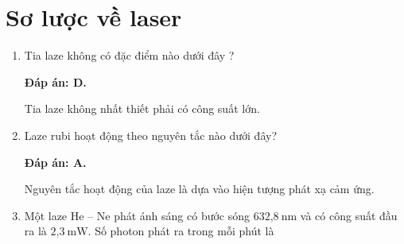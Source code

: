 \section{Sơ lược về laser}
\begin{enumerate}[label=\bfseries Câu \arabic*:]

\item {}
	
	\cauhoi
	{Tia laze không có đặc điểm nào dưới đây ?	
	}
	
	\loigiai
	{		\textbf{Đáp án: D.}
		
Tia laze không nhất thiết phải có công suất lớn.
		
	}
	
\item {} 
	
	\cauhoi
	{Laze rubi hoạt động theo nguyên tắc nào dưới đây?
	}
	
	\loigiai
	{		\textbf{Đáp án: A.}
		
Nguyên tắc hoạt động của laze là dựa vào hiện tượng phát xạ cảm ứng.
		
	}
	
	\item {}
	
	\cauhoi
	{Một laze He – Ne phát ánh sáng có bước sóng $\text{632,8}\ \text{nm}$ và có công suất đầu ra là $\text{2,3}\ \text{mW}$. Số photon phát ra trong mỗi phút là
	}
	

\end{enumerate}

